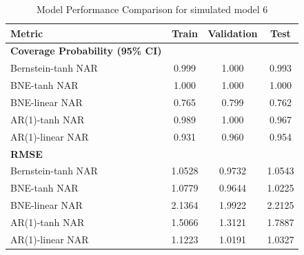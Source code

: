 \documentclass{article}
\begin{document}
\begin{table}[htbp]
\centering
\caption{Model Performance Comparison for simulated model 6}
\label{tab:model6_test_ber}
\begin{tabular}{lccc}
\toprule
\textbf{Metric} & \textbf{Train} & \textbf{Validation} & \textbf{Test} \\
\midrule
\textbf{Coverage Probability (95\% CI)} & & & \\
Bernstein-tanh NAR & 0.999 & 1.000 & 0.993 \\
BNE-tanh NAR & 1.000 & 1.000 & 1.000 \\
BNE-linear NAR & 0.765 & 0.799 & 0.762 \\
AR(1)-tanh NAR & 0.989 & 1.000 & 0.967 \\
AR(1)-linear NAR & 0.931 & 0.960 & 0.954 \\
\midrule
\textbf{RMSE} & & & \\
Bernstein-tanh NAR & 1.0528 & 0.9732 & 1.0543 \\
BNE-tanh NAR & 1.0779 & 0.9644 & 1.0225 \\
BNE-linear NAR & 2.1364 & 1.9922 & 2.2125 \\
AR(1)-tanh NAR & 1.5066 & 1.3121 & 1.7887 \\
AR(1)-linear NAR & 1.1223 & 1.0191 & 1.0327 \\
\bottomrule
\end{tabular}
\end{table}
\end{document}
